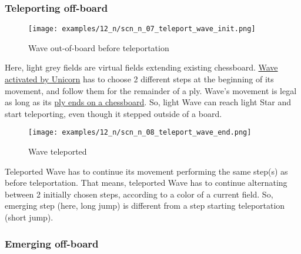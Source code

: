 \subsubsection*{Teleporting off-board}
\label{sec:Nineteen/Star/Teleporting pieces/Teleporting off-board}

\vspace*{-1.3\baselineskip}
\noindent
\begin{figure}[!h]
\texttt{[image: examples/12\_n/scn\_n\_07\_teleport\_wave\_init.png]}
\caption{Wave out-of-board before teleportation}
\label{fig:scn_n_07_teleport_wave_init}
\end{figure}

Here, light grey fields are virtual fields extending existing chessboard.
\hyperref[fig:scn_mv_24_wave_activation_by_unicorn_first_step]{Wave activated by Unicorn}
has to choose 2 different steps at the beginning of its movement, and follow
them for the remainder of a ply. Wave's movement is legal as long as its
\hyperref[fig:scn_mv_27_wave_off_board]{ply ends on a chessboard}. So, light
Wave can reach light Star and start teleporting, even though it stepped
outside of a board.

\clearpage %

\vspace*{-2.0\baselineskip}
\noindent
\begin{figure}[!h]
\texttt{[image: examples/12\_n/scn\_n\_08\_teleport\_wave\_end.png]}
\caption{Wave teleported}
\label{fig:scn_n_08_teleport_wave_end}
\end{figure}

Teleported Wave has to continue its movement performing the same step(s) as
before teleportation. That means, teleported Wave has to continue alternating
between 2 initially chosen steps, according to a color of a current field. So,
emerging step (here, long jump) is different from a step starting teleportation
(short jump).

\clearpage %

\subsubsection*{Emerging off-board}
\label{sec:Nineteen/Star/Teleporting pieces/Emerging off-board}

